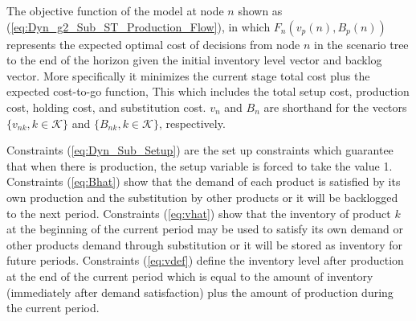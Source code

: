 \documentclass[10pt]{article}
\newcommand{\ka}{k} %
\newcommand{\KA}{\mathcal{K}}
\newcommand{\Bi}{B} %
\newcommand{\Vi}{v} %
\newcommand{\Es}{S} %
\newcommand{\InvPos}{inventory level after production }
\begin{document}
The objective function of the model at node $n$ shown as (\ref{eq:Dyn_g2_Sub_ST_Production_Flow}), in which $F_{n}({\Vi}_p(n),{\Bi}_p(n)) $ represents the expected optimal cost of decisions from node $n$ in the scenario tree to the end of the horizon given the initial inventory level vector and backlog vector. More specifically it minimizes the current stage total cost plus the expected cost-to-go function, This which includes the total setup cost, production cost, holding cost, and substitution cost.  $\Vi_n$ and $\Bi_n$ are shorthand for the vectors $\{ v_{nk}, \ka \in \KA\}$ and $\{ B_{nk}, \ka \in \KA\}$, respectively.

Constraints (\ref{eq:Dyn_Sub_Setup}) are the set up constraints which guarantee that when there is production, the setup variable is forced to take the value 1. 
Constraints (\ref{eq:Bhat}) show that the demand of each product is satisfied by its own production and the substitution by other products or it will be backlogged to the next period.
Constraints (\ref{eq:vhat}) show that the inventory of product $\ka$ at the beginning of the current period may be used to satisfy its own demand or other products demand through substitution or it will be stored as inventory for future periods. 
Constraints (\ref{eq:vdef}) define the \InvPos at the end of the current period which is equal to the amount of inventory (immediately after demand satisfaction) plus the amount of production during the current period.
\end{document}
